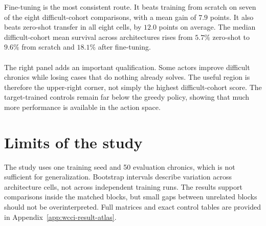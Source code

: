 \noindent Fine-tuning is the most consistent route. It beats training from scratch on
seven of the eight difficult-cohort comparisons, with a mean gain of $7.9$
points. It also beats zero-shot transfer in all eight cells, by $12.0$ points on
average. The median difficult-cohort mean survival across architectures rises from $5.7\%$ zero-shot to
$9.6\%$ from scratch and $18.1\%$ after fine-tuning.
\\
\\
The right panel adds an important qualification. Some actors improve difficult
chronics while losing cases that do nothing already solves. The useful region
is therefore the upper-right corner, not simply the highest difficult-cohort
score. The target-trained controls remain far below the greedy policy, showing
that much more performance is available in the action space.

\section{Limits of the study}

The study uses one training seed and 50 evaluation chronics, which is not sufficient for generalization. Bootstrap intervals
describe variation across architecture cells, not across independent training
runs. The results support comparisons inside the matched blocks, but small gaps between unrelated
blocks should not be overinterpreted. Full matrices and exact control tables are
provided in Appendix~\ref{app:wcci-result-atlas}.

